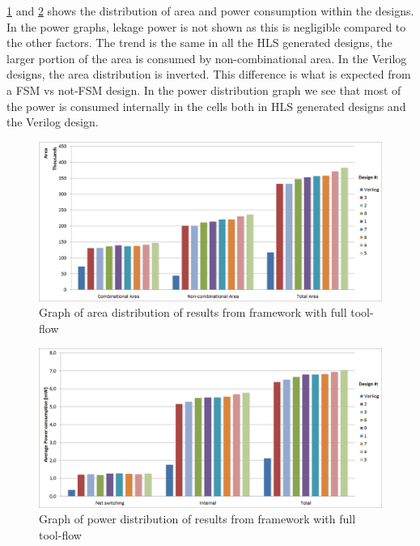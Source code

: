 \cref{fig:resultgraphareaframeworkrun2} and \cref{fig:resultgraphpowerframeworkrun2} shows the distribution of area and power consumption within the designs. In the power graphs, lekage power is not shown as this is negligible compared to the other factors. The trend is the same in all the HLS generated designs, the larger portion of the area is consumed by non-combinational area. In the Verilog designs, the area distribution is inverted. This difference is what is expected from a FSM vs not-FSM design. In the power distribution graph we see that most of the power is consumed internally in the cells both in HLS generated designs and the Verilog design.

\begin{figure}[hbpt]
\centering
\includegraphics[width=\textwidth]{../figs/resultGraphAreaDistribution.png}
\caption{\label{fig:resultgraphareaframeworkrun2}Graph of area distribution of results from framework with full tool-flow}
\end{figure}

\begin{figure}[hbpt]
\centering
\includegraphics[width=\textwidth]{../figs/resultGraphPowerDistribution.png}
\caption{\label{fig:resultgraphpowerframeworkrun2}Graph of power distribution of results from framework with full tool-flow}
\end{figure}

